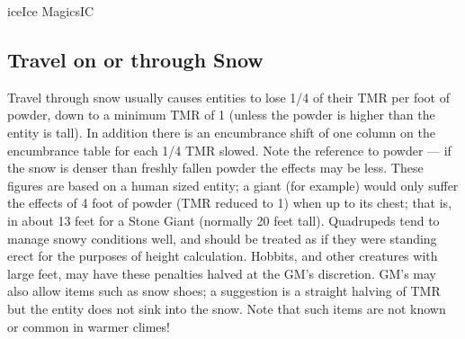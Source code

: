 \begin{College}[1.5]{ice}{Ice Magics}{IC}
\subsection{Travel on or through Snow}

Travel through snow usually causes entities to lose 1/4 of their TMR
per foot of powder, down to a minimum TMR of 1 (unless the powder is
higher than the entity is tall).  In addition there is an encumbrance
shift of one column on the encumbrance table for each 1/4 TMR slowed.
Note the reference to powder — if the snow is denser than freshly
fallen powder the effects may be less.  These figures are based on a
human sized entity; a giant (for example) would only suffer the
effects of 4 foot of powder (TMR reduced to 1) when up to its chest;
that is, in about 13 feet for a Stone Giant (normally 20 feet
tall). Quadrupeds tend to manage snowy conditions well, and should be
treated as if they were standing erect for the purposes of height
calculation. Hobbits, and other creatures with large feet, may have
these penalties halved at the GM’s discretion.  GM’s may also allow
items such as snow shoes; a suggestion is a straight halving of TMR
but the entity does not sink into the snow.  Note that such items are
not known or common in warmer climes!

\end{College}
